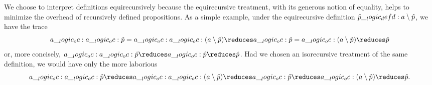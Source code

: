 
We choose to interpret definitions equirecursively
because the equirecursive treatment, with its generous notion of equality, helps to minimize the overhead of recursively defined propositions.
As a simple example, under the equirecursive definition $\hat{p} \__logic_defd: a \mathbin { \setminus } \hat{p}$, we have the trace
\begin{equation*}
  a \oc a \oc \defp{p} = a \oc a \oc (a \limp \defp{p}) \reduces a \oc \defp{p} = a \oc (a \limp \defp{p}) \reduces \defp{p}
\end{equation*}
or, more concisely, $a \oc a \oc \defp{p} \reduces a \oc \defp{p} \reduces \defp{p}$.
Had we chosen
 an isorecursive treatment of the same definition, we would have only the more laborious
\begin{equation*}
  a \oc a \oc \defp{p} \reduces a \oc a \oc (a \limp \defp{p}) \reduces a \oc \defp{p} \reduces a \oc (a \limp \defp{p}) \reduces \defp{p}
  .
\end{equation*}

